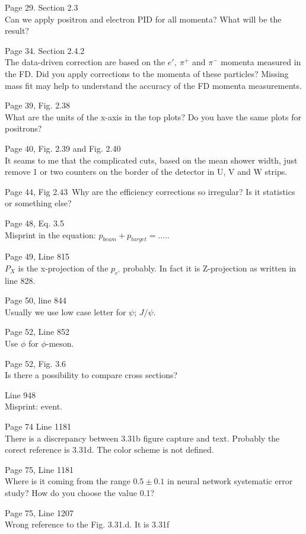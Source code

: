 \documentclass[11pt]{article}
\begin{document}
Page 29. Section 2.3\\
Can we apply positron and electron PID for all momenta? What will be the result?

Page 34. Section 2.4.2\\
The data-driven correction are based on the $e',~\pi^+$ and $\pi^-$ momenta measured in the FD. Did you apply corrections to the momenta of these particles? Missing mass fit may help to understand the accuracy of the FD momenta measurements.

Page 39, Fig. 2.38\\
What are the units of the x-axis in the top plots?
Do you have the same plots for positrons?

Page 40, Fig. 2.39 and Fig. 2.40\\
It seams to me that the complicated cuts, based on the mean shower width,  just remove 1 or two counters on the border of the detector in U, V and W strips.

Page 44, Fig 2.43\
Why are the efficiency corrections so irregular? Is it statistics or something else?

Page 48, Eq. 3.5\\
Misprint in the equation: $p_{beam}+p_{target}=....$.

Page 49, Line 815\\
$P_X$ is the x-projection of the $p_{e'}$ probably. In fact it is Z-projection as written in line 828.

Page 50, line 844\\
Usually we use low case letter for $\psi$; $J/\psi$.

Page 52, Line 852\\
Use $\phi$ for $\phi$-meson.

Page 52, Fig. 3.6\\
Is there a possibility to compare cross sections? 

Line 948\\
Misprint: event.

Page 74 Line 1181\\
There is a discrepancy between 3.31b figure capture and text. Probably the corect reference is 3.31d.
The color scheme is not defined.

Page 75, Line 1181\\
Where is it coming from the range $0.5\pm0.1$  in neural network  systematic error study? 
How do you choose the value 0.1?

Page 75, Line 1207\\
Wrong reference to the Fig. 3.31.d. It is 3.31f
\end{document}
